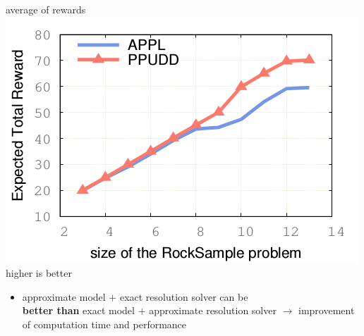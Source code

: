 \documentclass[12pt,svgnames,table]{beamer}
\begin{document}
\begin{frame}
{\begin{minipage}{0.43\linewidth}
	{\color{orange} average of rewards} \\
\vspace{-0.03cm}  
	\includegraphics[scale=0.4]{courbePerfTime.png} \\
\hspace{0.1cm} { \color{gggreen} higher is better}
	\end{minipage}

\vspace{-0.1cm}
\begin{alertblock}{}
\begin{itemize}
\item approximate model $+$ exact resolution solver can be \\
\textbf{better than} exact model $+$ approximate resolution solver
$\rightarrow$ improvement of computation time and performance
\end{itemize}
\end{alertblock}
}
\end{frame}



\newcommand{\grillethird}{
 \begin{tikzpicture}[overlay,remember picture]
   \begin{scope}[shift={(current page.south west)}]
	\tikzstyle{vertexBIGRED}=[fill=red!30,draw=red, minimum width=320pt, minimum height=30pt,line width=1pt,inner sep=5pt,rounded corners]
	\node[vertexBIGRED] at (6.5,7.4) {};
	\node at (6.5,7.4) {PPUDD outperforms its probabilistic counterpart};
   \end{scope}
 \end{tikzpicture}
 }
\end{document}

